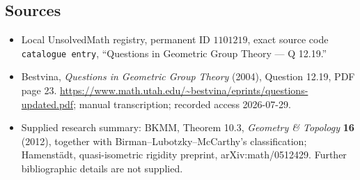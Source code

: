 \documentclass[11pt]{article}
\begin{document}
\subsection{Sources}
\begin{itemize}
\item Local UnsolvedMath registry, permanent ID \(1101219\), exact source code \texttt{catalogue entry}, ``Questions in Geometric Group Theory --- Q 12.19.''
\item Bestvina, \emph{Questions in Geometric Group Theory} (2004), Question 12.19, PDF page 23. \url{https://www.math.utah.edu/~bestvina/eprints/questions-updated.pdf}; manual transcription; recorded access 2026-07-29.
\item Supplied research summary: BKMM, Theorem 10.3, \emph{Geometry \& Topology} \textbf{16} (2012), together with Birman--Lubotzky--McCarthy's classification; Hamenst\"adt, quasi-isometric rigidity preprint, arXiv:math/0512429. Further bibliographic details are not supplied.
\end{itemize}
\end{document}

